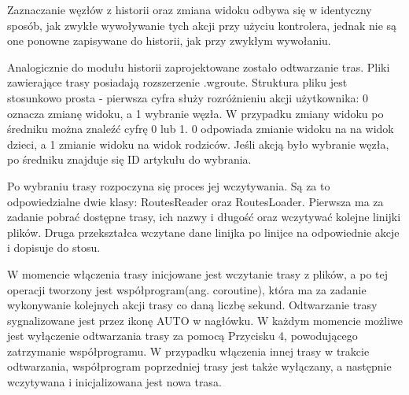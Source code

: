 Zaznaczanie węzłów z historii oraz zmiana widoku odbywa się w identyczny sposób, jak zwykłe wywoływanie tych akcji przy użyciu kontrolera, jednak nie są one ponowne zapisywane do historii, jak przy zwykłym wywołaniu.

Analogicznie do modułu historii zaprojektowane zostało odtwarzanie tras. Pliki zawierające trasy posiadają rozszerzenie .wgroute. Struktura pliku jest stosunkowo prosta - pierwsza cyfra służy rozróżnieniu akcji użytkownika: 0 oznacza zmianę widoku, a 1 wybranie węzła. W przypadku zmiany widoku po średniku można znaleźć cyfrę 0 lub 1. 0 odpowiada zmianie widoku na na widok dzieci, a 1 zmianie widoku na widok rodziców. Jeśli akcją było wybranie węzła, po średniku znajduje się ID artykułu do wybrania. 

Po wybraniu trasy rozpoczyna się proces jej wczytywania. Są za to odpowiedzialne dwie klasy: RoutesReader oraz RoutesLoader. Pierwsza ma za zadanie pobrać dostępne trasy, ich nazwy i długość oraz wczytywać kolejne linijki plików. Druga przekształca wczytane dane linijka po linijce na odpowiednie akcje i dopisuje do stosu.

W momencie włączenia trasy inicjowane jest wczytanie trasy z plików, a po tej operacji tworzony jest współprogram(ang. coroutine), która ma za zadanie wykonywanie kolejnych akcji trasy co daną liczbę sekund. Odtwarzanie trasy sygnalizowane jest przez ikonę AUTO w nagłówku. W każdym momencie możliwe jest wyłączenie odtwarzania trasy za pomocą Przycisku 4, powodującego zatrzymanie współprogramu. W przypadku włączenia innej trasy w trakcie odtwarzania, współprogram poprzedniej trasy jest także wyłączany, a następnie wczytywana i inicjalizowana jest nowa trasa. 
